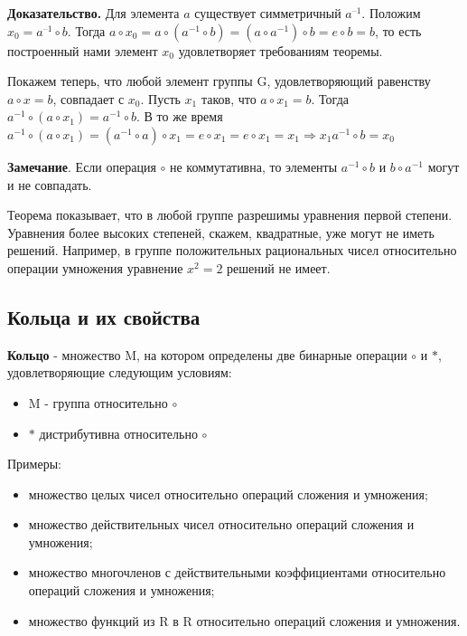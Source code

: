 \documentclass[a4paper]{article}
\begin{document}
\begin{hproof}
\textbf{Доказательство.}  Для элемента $a$ существует симметричный $a^{–1}$. Положим
$x_0 = a^{–1} \circ b.$ Тогда
$a \circ x_0 = a \circ (a^{-1} \circ b) = (a \circ a^{-1} ) \circ b = e \circ b = b$, то есть построенный нами элемент $x_0$ удовлетворяет требованиям теоремы.

Покажем теперь, что любой элемент группы G, удовлетворяющий равенству $a \circ x = b$, совпадает с $x_0$. Пусть $x_1$ таков, что $a \circ x_1 = b$. Тогда $a^{-1} \circ (a \circ x_1) = a^{-1} \circ b$. В то же время $a^{-1} \circ (a \circ x_1) = (a^{-1} \circ a) \circ x_1 = e \circ x_1 = e \circ x_1 = x_1 \Rightarrow x_1  a^{-1} \circ b = x_0$

\textbf{Замечание}. Если операция $\circ$  не коммутативна, то элементы $a^{-1} \circ b$ и $b \circ a^{-1}$ могут и не совпадать.
\end{hproof}

Теорема показывает, что в любой группе разрешимы уравнения первой
степени. Уравнения более высоких степеней, скажем, квадратные, уже могут не
иметь решений. Например, в группе положительных рациональных чисел
относительно операции умножения уравнение $x^2 = 2$ решений не имеет.


\newpage \begin{center}\begin{Large}\end{Large}\end{center}

\subsection*{Кольца и их свойства}
\textbf{Кольцо} - множество M, на котором определены две бинарные операции $\circ$ и $*$, удовлетворяющие следующим условиям:
\begin{itemize}
\item M - группа относительно $\circ$
\item $*$ дистрибутивна относительно $\circ$
\end{itemize}

Примеры:
\begin{itemize}
\item множество целых чисел относительно операций сложения и умножения;
\item множество действительных чисел относительно операций сложения и
умножения;
\item множество многочленов с действительными коэффициентами
относительно операций сложения и умножения;
\item множество функций из R в R относительно операций сложения и умножения.
\end{itemize}
\end{document}
